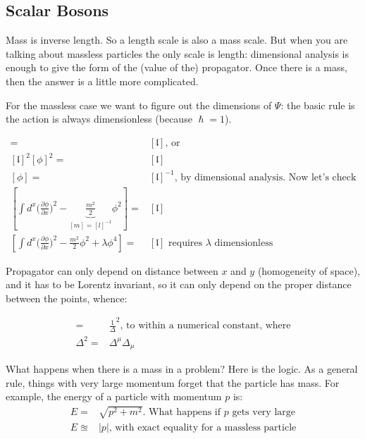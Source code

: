 \documentclass[]{article}
\begin{document}
\subsection{Scalar Bosons}

Mass is inverse length. So a length scale is also a mass scale. But when you are talking about massless particles the only scale is length: dimensional analysis is enough to give the form of the (value of the) propagator. Once there is a mass, then the answer is a little more complicated.

For the massless case we want to figure out the dimensions of $\Psi$: the basic rule is the action is always dimensionless (because $\hslash=1$).



\begin{align*}
	[\int d^x \big(\frac{\partial \phi}{\partial x}\big)^2] =&[\mathfrak{l}] \text{, or}\\
	[\mathfrak{l}]^2[\phi]^2=&[\mathfrak{l}]\\
	[\phi]=&[\mathfrak{l}]^{-1} \text{, by dimensional analysis. Now let's check}\\
	[\int d^x \big(\frac{\partial \phi}{\partial x}\big)^2 - \underbrace{\frac{m^2}{2}}_\text{$[m]=[l]^{-1}$} \phi^2]=&[\mathfrak{l}]\\
	[\int d^x \big(\frac{\partial \phi}{\partial x}\big)^2 - \frac{m^2}{2}\phi^2 + \lambda \phi^4] =&[\mathfrak{l}] \text{ requires $\lambda$ dimensionless}
\end{align*}

Propagator can only depend on distance between $x$ and $y$ (homogeneity of space), and it has to be Lorentz invariant, so it can only depend on the proper distance between the points, whence:

\begin{align*}
	[\braket{0|\Phi(x)\Phi(y)|0}]=&\frac{1}{\Delta}^2 \text{, to within a numerical constant, where}\\
	\Delta^2 =& \Delta^\mu\Delta_\mu
\end{align*}

What happens when there is a mass in a problem? Here is the logic. As a general rule, things with very large momentum forget that the particle has mass. For example, the energy of a particle with momentum $p$ is:
\begin{align*}
	E =& \sqrt{p^2 + m^2} \text{. What happens if $p$ gets very large}\\
	E \approxeq& \lvert p \rvert \text{, with exact equality for a massless particle}
\end{align*} 
\end{document}
